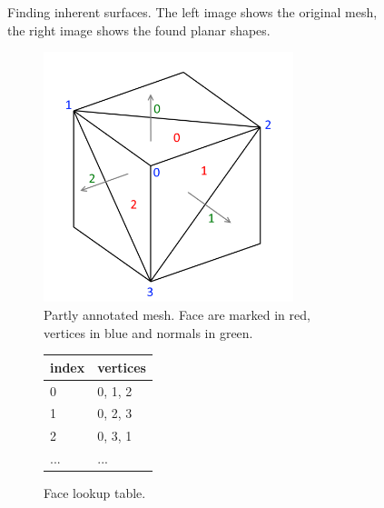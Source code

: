 \documentclass[../ClassicThesis.tex]{subfiles}
\begin{document}
\begin{figure}
\begin{subfigure}[t]{0.4\textwidth}
    \end{subfigure}
    \caption{Finding inherent surfaces. The left image shows the original mesh, the right image shows the found planar shapes.}
    \label{fig:coplanar}
\end{figure}

\begin{figure}
  \centering
  \begin{subfigure}[t]{0.8\textwidth}
    \centering
    \includegraphics[width=0.8\textwidth]{Images/facevertexmesh.png}
    \caption{Partly annotated mesh. Face are marked in red, vertices in blue and normals in green.}
    \vspace{.5cm}
  \end{subfigure}
  \begin{subfigure}[t]{0.32\textwidth}
    \centering
    \begin{tabular}{ | l | l | }
      \hline
      index & vertices \\ \hline
      0 & 0, 1, 2 \\ \hline
      1 & 0, 2, 3 \\ \hline
      2 & 0, 3, 1 \\ \hline
      ... & ... \\
      \hline
    \end{tabular}
    \caption{Face lookup table.}
  \end{subfigure}
  \begin{subfigure}[t]{0.32\textwidth}
    \centering
    \begin{tabular}{ | l | l | }
      \hline

\end{tabular}
\end{subfigure}
\end{figure}
\end{document}
